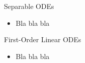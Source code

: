 %
%


\begin{topic}

\end{topic}





\begin{module}{Separable ODEs}
	\begin{itemize}
		\item Bla bla bla	
	\end{itemize}
	


\end{module}





\begin{module}{First-Order Linear ODEs}
	\begin{itemize}
		\item Bla bla bla	
	\end{itemize}
	


\end{module}

